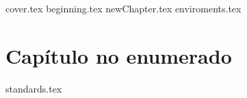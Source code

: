 \documentclass[11pt, oneside]{book}
\begin{document}
	{cover.tex}
	\frontmatter
		{beginning.tex}
		\tableofcontents
	\mainmatter
	{newChapter.tex}\cleanalldata
	{enviroments.tex}\cleanalldata
	\chapter*{Capítulo no enumerado}
	\appendix
		{standards.tex}\cleanalldata
%	
%	
\end{document}
